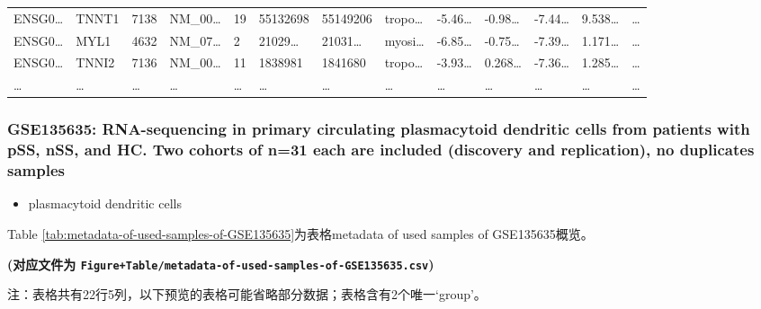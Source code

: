 \documentclass[
]{article}
\providecommand{\tightlist}{%
  \setlength{\itemsep}{0pt}\setlength{\parskip}{0pt}}
\begin{document}
\begin{longtable}[]{@{}lllllllllllll@{}}
ENSG0\ldots{} & TNNT1 & 7138 & NM\_00\ldots{} & 19 & 55132698 & 55149206 & tropo\ldots{} & -5.46\ldots{} & -0.98\ldots{} & -7.44\ldots{} & 9.538\ldots{} & \ldots{}\tabularnewline
ENSG0\ldots{} & MYL1 & 4632 & NM\_07\ldots{} & 2 & 21029\ldots{} & 21031\ldots{} & myosi\ldots{} & -6.85\ldots{} & -0.75\ldots{} & -7.39\ldots{} & 1.171\ldots{} & \ldots{}\tabularnewline
ENSG0\ldots{} & TNNI2 & 7136 & NM\_00\ldots{} & 11 & 1838981 & 1841680 & tropo\ldots{} & -3.93\ldots{} & 0.268\ldots{} & -7.36\ldots{} & 1.285\ldots{} & \ldots{}\tabularnewline
\ldots{} & \ldots{} & \ldots{} & \ldots{} & \ldots{} & \ldots{} & \ldots{} & \ldots{} & \ldots{} & \ldots{} & \ldots{} & \ldots{} & \ldots{}\tabularnewline
\bottomrule
\end{longtable}

\hypertarget{gse135635-rna-sequencing-in-primary-circulating-plasmacytoid-dendritic-cells-from-patients-with-pss-nss-and-hc.-two-cohorts-of-n31-each-are-included-discovery-and-replication-no-duplicates-samples}{%
\subsubsection{GSE135635: RNA-sequencing in primary circulating plasmacytoid dendritic cells from patients with pSS, nSS, and HC. Two cohorts of n=31 each are included (discovery and replication), no duplicates samples}\label{gse135635-rna-sequencing-in-primary-circulating-plasmacytoid-dendritic-cells-from-patients-with-pss-nss-and-hc.-two-cohorts-of-n31-each-are-included-discovery-and-replication-no-duplicates-samples}}

\begin{itemize}
\tightlist
\item
  plasmacytoid dendritic cells
\end{itemize}

Table \ref{tab:metadata-of-used-samples-of-GSE135635}为表格metadata of used samples of GSE135635概览。

\textbf{(对应文件为 \texttt{Figure+Table/metadata-of-used-samples-of-GSE135635.csv})}

\begin{center}\begin{tcolorbox}[colback=gray!10, colframe=gray!50, width=0.9\linewidth, arc=1mm, boxrule=0.5pt]注：表格共有22行5列，以下预览的表格可能省略部分数据；表格含有2个唯一`group'。
\end{tcolorbox}
\end{center}
\end{document}
